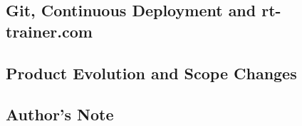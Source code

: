 \subsection{Git, Continuous Deployment and rt-trainer.com}
\label{sse:git-cd-rt-trainer}

\subsection{Product Evolution and Scope Changes}
\label{sse:evolution-scope}

\subsection{Author's Note}
\label{sse:authorsnote}